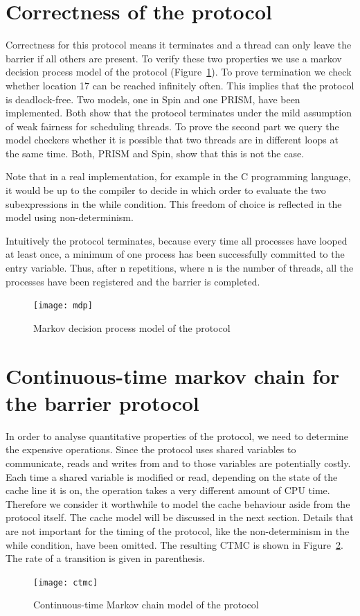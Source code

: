 \documentclass[a4paper, 10pt]{article}
\begin{document}
\section{Correctness of the protocol}
\label{sec:correctness}
Correctness for this protocol means it terminates and a thread can only leave the barrier if all others are present. To verify these two properties we use a markov decision process model of the protocol (Figure~\ref{fig:mdp}). To prove termination we check whether location 17 can be reached infinitely often. This implies that the protocol is deadlock-free. Two models, one in Spin\cite{spin} and one PRISM\cite{prism}, have been implemented. Both show that the protocol terminates under the mild assumption of weak fairness for scheduling threads. To prove the second part we query the model checkers whether it is possible that two threads are in different loops at the same time. Both, PRISM and Spin, show that this is not the case.

Note that in a real implementation, for example in the C programming language, it would be up to the compiler to decide in which order to evaluate the two subexpressions in the while condition. This freedom of choice is reflected in the model using non-determinism.

Intuitively the protocol terminates, because every time all processes have looped at least once, a minimum of one process has been successfully committed to the entry variable. Thus, after n repetitions, where n is the number of threads, all the processes have been registered and the barrier is completed.

\begin{figure}[htbp]
	\centering
	\texttt{[image: mdp]}
	\caption{Markov decision process model of the protocol}
	\label{fig:mdp}
\end{figure}

\clearpage

\section{Continuous-time markov chain for the barrier protocol}
In order to analyse quantitative properties of the protocol, we need to determine the expensive operations. Since the protocol uses shared variables to communicate, reads and writes from and to those variables are potentially costly. Each time a shared variable is modified or read, depending on the state of the cache line it is on, the operation takes a very different amount of CPU time. Therefore we consider it worthwhile to model the cache behaviour aside from the protocol itself. The cache model will be discussed in the next section. Details that are not important for the timing of the protocol, like the non-determinism in the while condition, have been omitted. The resulting CTMC is shown in Figure~\ref{fig:ctmc}. The rate of a transition is given in parenthesis.
\begin{figure}[htbp]
	\centering
	\texttt{[image: ctmc]}
	\caption{Continuous-time Markov chain model of the protocol}
	\label{fig:ctmc}
\end{figure}
\end{document}
